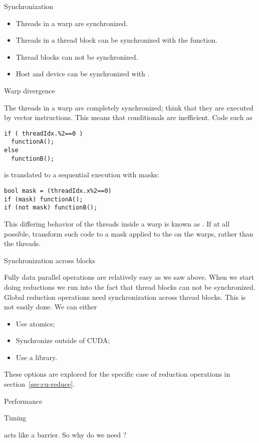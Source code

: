  {Synchronization}

\begin{itemize}
\item Threads in a warp are synchronized.
\item Threads in a thread block can be synchronized
  with the  function.
\item Thread blocks can not be synchronized.
\item Host and device can be synchronized
  with .
\end{itemize}

 {Warp divergence}

The threads in a warp are completely synchronized;
think that they are executed by vector instructions.
This means that conditionals are inefficient.
Code such as
\begin{lstlisting}
if ( threadIdx.%2==0 )
  functionA();
else
  functionB();
\end{lstlisting}
is translated to a sequential execution with masks:
\begin{lstlisting}
bool mask = (threadIdx.x%2==0)
if (mask) functionA();
if (not mask) functionB();
\end{lstlisting}
This differing behavior of the threads inside a warp is known as
.
If at all possible, transform such code
to a mask applied to the on the warps,
rather than the threads.

 {Synchronization across blocks}

Fully data parallel operations are relatively easy
as we saw above.
When we start doing reductions we run into the fact that
thread blocks can not be synchronized.
Global reduction operations need synchronization across thread blocks.
This is not easily done. We can either
\begin{itemize}
\item Use atomics;
\item Synchronize outside of CUDA;
\item Use a library.
\end{itemize}

These options are explored for the specific case of reduction operations
in section~\ref{sec:cu-reduce}.

 {Performance}

 {Timing}

 acts like a barrier.
So why do we need ?

